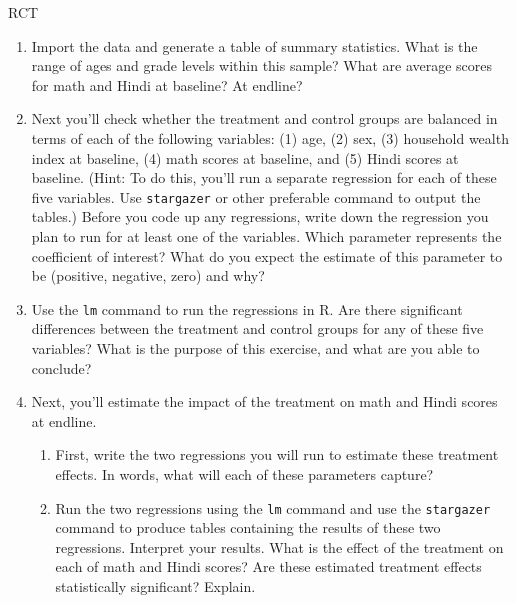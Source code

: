 \begin{homeworkProblem}{RCT}
    \begin{enumerate}
        \item Import the data and generate a table of summary statistics. What 
            is the range of ages and grade levels within this sample? What are 
            average scores for math and Hindi at baseline? At endline?

        \item Next you’ll check whether the treatment and control groups are 
            balanced in terms of each of the following variables: (1) age, (2) 
            sex, (3) household wealth index at baseline, (4) math scores at 
            baseline, and (5) Hindi scores at baseline. (Hint: To do this, 
            you’ll run a separate regression for each of these five variables. 
            Use \texttt{stargazer} or other preferable command to output the 
            tables.) Before you code up any regressions, write down the 
            regression you plan to run for at least one of the variables. 
            Which parameter represents the coefficient of interest? What do 
            you expect the estimate of this parameter to be (positive, 
            negative, zero) and why?

        \item Use the \texttt{lm} command to run the regressions in R. Are 
            there significant differences between the treatment and control 
            groups for any of these five variables? What is the purpose of 
            this exercise, and what are you able to conclude?

        \item Next, you’ll estimate the impact of the treatment on math and 
            Hindi scores at endline.

        \begin{enumerate}
            \item First, write the two regressions you will run to estimate 
                these treatment effects. In words, what will each of these 
                parameters capture?
            \item Run the two regressions using the \texttt{lm} command and 
                use the \texttt{stargazer} command to produce tables containing 
                the results of these two regressions. Interpret your results. 
                What is the effect of the treatment on each of math and Hindi 
                scores? Are these estimated treatment effects statistically 
                significant? Explain.
        \end{enumerate}
        

\end{enumerate}
\end{homeworkProblem}
